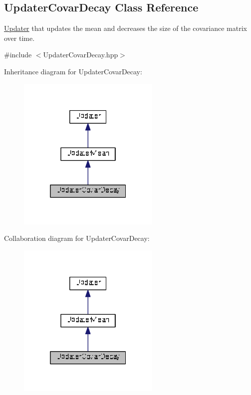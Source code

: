 \hypertarget{classDmpBbo_1_1UpdaterCovarDecay}{\subsection{Updater\+Covar\+Decay Class Reference}
\label{classDmpBbo_1_1UpdaterCovarDecay}
}


\hyperlink{classDmpBbo_1_1Updater}{Updater} that updates the mean and decreases the size of the covariance matrix over time.  




{\ttfamily \#include $<$Updater\+Covar\+Decay.\+hpp$>$}



Inheritance diagram for Updater\+Covar\+Decay\+:
\nopagebreak
\begin{figure}[H]
\begin{center}
\leavevmode
\includegraphics[width=193pt]{classDmpBbo_1_1UpdaterCovarDecay__inherit__graph}
\end{center}
\end{figure}


Collaboration diagram for Updater\+Covar\+Decay\+:
\nopagebreak
\begin{figure}[H]
\begin{center}
\leavevmode
\includegraphics[width=193pt]{classDmpBbo_1_1UpdaterCovarDecay__coll__graph}
\end{center}
\end{figure}

